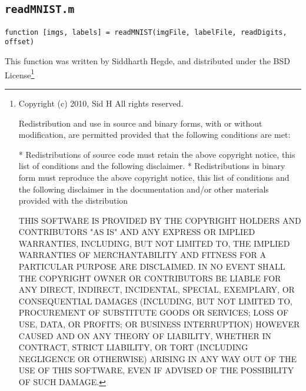\documentclass[]{article}
\theoremstyle{plain}
\theoremstyle{definition}
\begin{document}
\subsection{\texttt{readMNIST.m}}
\begin{verbatim}
function [imgs, labels] = readMNIST(imgFile, labelFile, readDigits, offset)
\end{verbatim}
\doublespacing
This function was written by Siddharth Hegde, and distributed under the BSD License\textsl{}\footnote{Copyright (c) 2010, Sid H
All rights reserved.

Redistribution and use in source and binary forms, with or without
modification, are permitted provided that the following conditions are
met:

    * Redistributions of source code must retain the above copyright
      notice, this list of conditions and the following disclaimer.
    * Redistributions in binary form must reproduce the above copyright
      notice, this list of conditions and the following disclaimer in
      the documentation and/or other materials provided with the distribution

THIS SOFTWARE IS PROVIDED BY THE COPYRIGHT HOLDERS AND CONTRIBUTORS "AS IS"
AND ANY EXPRESS OR IMPLIED WARRANTIES, INCLUDING, BUT NOT LIMITED TO, THE
IMPLIED WARRANTIES OF MERCHANTABILITY AND FITNESS FOR A PARTICULAR PURPOSE
ARE DISCLAIMED. IN NO EVENT SHALL THE COPYRIGHT OWNER OR CONTRIBUTORS BE
LIABLE FOR ANY DIRECT, INDIRECT, INCIDENTAL, SPECIAL, EXEMPLARY, OR
CONSEQUENTIAL DAMAGES (INCLUDING, BUT NOT LIMITED TO, PROCUREMENT OF
SUBSTITUTE GOODS OR SERVICES; LOSS OF USE, DATA, OR PROFITS; OR BUSINESS
INTERRUPTION) HOWEVER CAUSED AND ON ANY THEORY OF LIABILITY, WHETHER IN
CONTRACT, STRICT LIABILITY, OR TORT (INCLUDING NEGLIGENCE OR OTHERWISE)
ARISING IN ANY WAY OUT OF THE USE OF THIS SOFTWARE, EVEN IF ADVISED OF THE
POSSIBILITY OF SUCH DAMAGE.}
\end{document}
